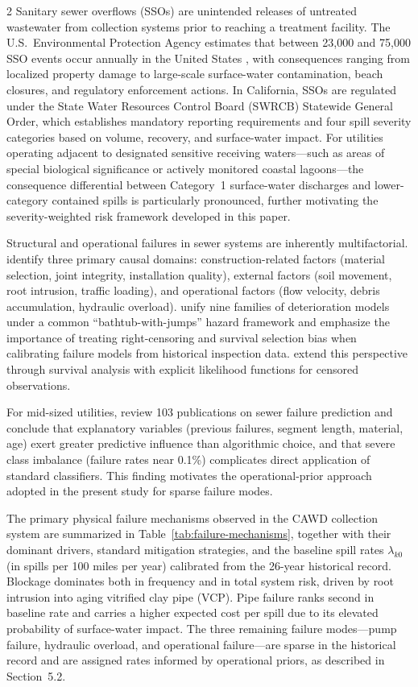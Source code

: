 \documentclass[10pt]{article}
\begin{document}
\begin{multicols}{2}
Sanitary sewer overflows (SSOs) are unintended releases of untreated
wastewater from collection systems prior to reaching a treatment facility.
The U.S.\ Environmental Protection Agency estimates that between
23{,}000 and 75{,}000 SSO events occur annually in the United States
\citep{epa2024}, with consequences ranging from localized property damage
to large-scale surface-water contamination, beach closures, and regulatory
enforcement actions. In California, SSOs are regulated under the State
Water Resources Control Board (SWRCB) Statewide General Order, which
establishes mandatory reporting requirements and four spill severity
categories based on volume, recovery, and surface-water impact. For
utilities operating adjacent to designated sensitive receiving waters---such
as areas of special biological significance or actively monitored coastal
lagoons---the consequence differential between Category~1 surface-water
discharges and lower-category contained spills is particularly pronounced,
further motivating the severity-weighted risk framework developed in this
paper.
 
Structural and operational failures in sewer systems are inherently
multifactorial. \citet{davies2001} identify three primary causal domains:
construction-related factors (material selection, joint integrity,
installation quality), external factors (soil movement, root intrusion,
traffic loading), and operational factors (flow velocity, debris
accumulation, hydraulic overload). \citet{scheidegger2015} unify nine
families of deterioration models under a common ``bathtub-with-jumps''
hazard framework and emphasize the importance of treating right-censoring
and survival selection bias when calibrating failure models from historical
inspection data. \citet{duchesne2013} extend this perspective through
survival analysis with explicit likelihood functions for censored
observations.
 
For mid-sized utilities, \citet{foreroortiz2023} review 103 publications
on sewer failure prediction and conclude that explanatory variables
(previous failures, segment length, material, age) exert greater predictive
influence than algorithmic choice, and that severe class imbalance (failure
rates near 0.1\%) complicates direct application of standard classifiers.
This finding motivates the operational-prior approach adopted in the present
study for sparse failure modes.
 
The primary physical failure mechanisms observed in the CAWD collection
system are summarized in Table~\ref{tab:failure-mechanisms}, together with
their dominant drivers, standard mitigation strategies, and the baseline
spill rates $\lambda_{k0}$ (in spills per 100 miles per year) calibrated
from the 26-year historical record. Blockage dominates both in frequency
and in total system risk, driven by root intrusion into aging vitrified
clay pipe (VCP). Pipe failure ranks second in baseline rate and carries
a higher expected cost per spill due to its elevated probability of
surface-water impact. The three remaining failure modes---pump failure,
hydraulic overload, and operational failure---are sparse in the historical
record and are assigned rates informed by operational priors, as described
in Section~5.2.
 

\end{multicols}
\end{document}
